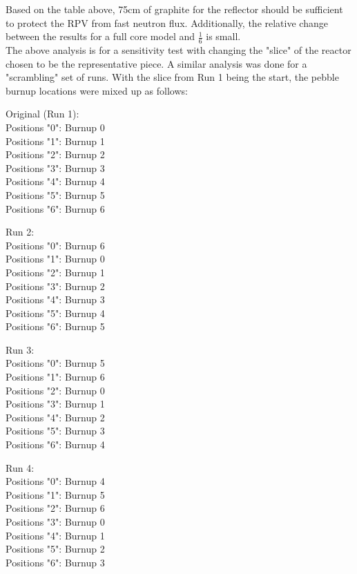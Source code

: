 \documentclass[letterpaper]{article}
\begin{document}
Based on the table above, 75cm of graphite for the reflector should be sufficient to protect the RPV from fast neutron flux.  Additionally, the relative change between the results for a full core model and $\frac{1}{6}$ is small.
\\

The above analysis is for a sensitivity test with changing the "slice" of the reactor chosen to be the representative piece.  A similar analysis was done for a "scrambling" set of runs.  With the slice from Run 1 being the start, the pebble burnup locations were mixed up as follows: \\

\begin{center}
Original (Run 1):\\
Positions "0": Burnup 0\\
Positions "1": Burnup 1\\
Positions "2": Burnup 2\\
Positions "3": Burnup 3\\
Positions "4": Burnup 4\\
Positions "5": Burnup 5\\
Positions "6": Burnup 6\\
\end{center}
\begin{center}
Run 2: \\
Positions "0": Burnup 6\\
Positions "1": Burnup 0\\
Positions "2": Burnup 1\\
Positions "3": Burnup 2\\
Positions "4": Burnup 3\\
Positions "5": Burnup 4\\
Positions "6": Burnup 5\\
\end{center}
\begin{center}
Run 3:\\
Positions "0": Burnup 5\\
Positions "1": Burnup 6\\
Positions "2": Burnup 0\\
Positions "3": Burnup 1\\
Positions "4": Burnup 2\\
Positions "5": Burnup 3\\
Positions "6": Burnup 4\\
\end{center}
\begin{center}
Run 4:\\
Positions "0": Burnup 4\\
Positions "1": Burnup 5\\
Positions "2": Burnup 6\\
Positions "3": Burnup 0\\
Positions "4": Burnup 1\\
Positions "5": Burnup 2\\
Positions "6": Burnup 3\\
\end{center}
\end{document}
